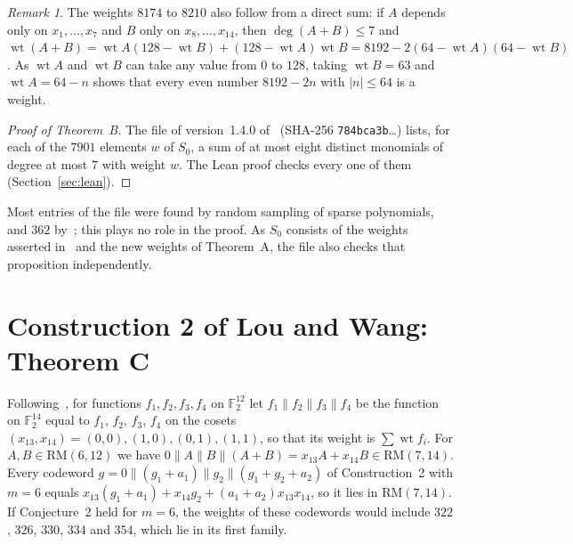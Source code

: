 \documentclass[11pt]{article}
\theoremstyle{remark}
\newtheorem{remark}[lemma]{Remark}
\newcommand{\F}{\mathbb F}
\newcommand{\RM}{\mathrm{RM}}
\DeclareMathOperator{\wt}{wt}
\newcommand{\cat}{\mathbin{\|}}
\begin{document}
\begin{remark}\label{rem:direct}
The weights $8174$ to $8210$ also follow from a direct sum: if $A$ depends only
on $x_1,\dots,x_7$ and $B$ only on $x_8,\dots,x_{14}$, then $\deg(A+B)\le7$ and
$\wt(A+B)=\wt A(128-\wt B)+(128-\wt A)\wt B=8192-2(64-\wt A)(64-\wt B)$. As
$\wt A$ and $\wt B$ can take any value from $0$ to $128$, taking $\wt B=63$ and
$\wt A=64-n$ shows that every even number $8192-2n$ with $|n|\le64$ is a
weight.
\end{remark}

\begin{proof}[Proof of Theorem~B]
The file  of
version~1.4.0 of~\cite{repo} (SHA-256 \texttt{784bca3b}\dots) lists, for each
of the $7901$ elements $w$ of $S_0$, a sum of at most eight distinct monomials of
degree at most $7$ with weight $w$. The Lean proof checks every one of them
(Section~\ref{sec:lean}).
\end{proof}

Most entries of the file were found by random sampling of sparse polynomials,
and $362$ by~\cite[Lemma~8]{la}; this plays no role in the proof. As $S_0$
consists of the weights asserted in~\cite[Proposition~4]{la} and the new
weights of Theorem~A, the file also checks that proposition independently.

\section{Construction 2 of Lou and Wang: Theorem C}\label{sec:lw}
Following~\cite{lw}, for functions $f_1,f_2,f_3,f_4$ on $\F_2^{12}$ let
$f_1\cat f_2\cat f_3\cat f_4$ be the function on $\F_2^{14}$ equal to $f_1$,
$f_2$, $f_3$, $f_4$ on the cosets $(x_{13},x_{14})=(0,0),(1,0),(0,1),(1,1)$, so
that its weight is $\sum\wt f_i$. For $A,B\in\RM(6,12)$ we have
$0\cat A\cat B\cat(A+B)=x_{13}A+x_{14}B\in\RM(7,14)$. Every codeword
$g=0\cat(g_1+a_1)\cat g_2\cat(g_1+g_2+a_2)$ of Construction~2 with $m=6$ equals
$x_{13}(g_1+a_1)+x_{14}g_2+(a_1+a_2)x_{13}x_{14}$, so it lies in $\RM(7,14)$.
If Conjecture~2 held for $m=6$, the weights of these codewords would include
$322$, $326$, $330$, $334$ and $354$, which lie in its first family.
\end{document}
